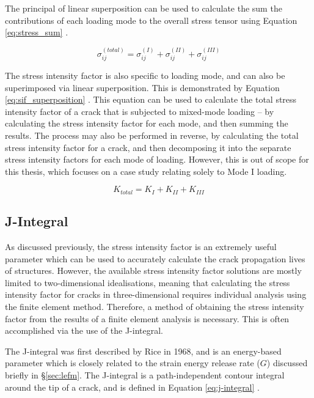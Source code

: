 The principal of linear superposition can be used to calculate the sum the contributions of each loading mode to the overall stress tensor using Equation \ref{eq:stress_sum} \cite{anderson_fracture_2017}.

\begin{equation}
	 \sigma_{ij}^{(total)} = \sigma_{ij}^{(I)} + \sigma_{ij}^{(II)} + \sigma_{ij}^{(III)}\label{eq:stress_sum}
\end{equation}

The stress intensity factor is also specific to loading mode, and can also be superimposed via linear superposition. This is demonstrated by Equation \ref{eq:sif_superposition} \cite{anderson_fracture_2017}. This equation can be used to calculate the total stress intensity factor of a crack that is subjected to mixed-mode loading -- by calculating the stress intensity factor for each mode, and then summing the results. The process may also be performed in reverse, by calculating the total stress intensity factor for a crack, and then decomposing it into the separate stress intensity factors for each mode of loading. However, this is out of scope for this thesis, which focuses on a case study relating solely to Mode I loading.

\begin{equation}
	K_{total} = K_{I} + K_{II} + K_{III}\label{eq:sif_superposition}
\end{equation}

\newpage
\subsection{J-Integral}\label{sec:j-integral}

As discussed previously, the stress intensity factor is an extremely useful parameter which can be used to accurately calculate the crack propagation lives of structures. However, the available stress intensity factor solutions are mostly limited to two-dimensional idealisations, meaning that calculating the stress intensity factor for cracks in three-dimensional requires individual analysis using the finite element method. Therefore, a method of obtaining the stress intensity factor from the results of a finite element analysis is necessary. This is often accomplished via the use of the J-integral.

The J-integral was first described by Rice in 1968, and is an energy-based parameter which is closely related to the strain energy release rate ($G$) discussed briefly in \S\ref{sec:lefm}. The J-integral is a path-independent contour integral around the tip of a crack, and is defined in Equation \ref{eq:j-integral} \cite{rice_path_1968}.

